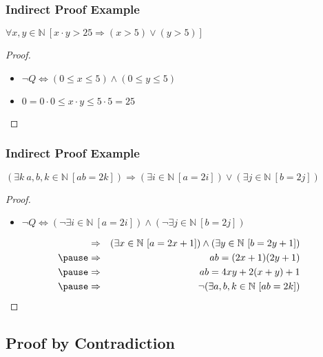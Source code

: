 \documentclass[dvipsnames]{beamer}
\begin{document}
\begin{frame}
  \frametitle{Indirect Proof Example}

  \begin{theorem}
    $\forall x,y \in \mathbb{N}~[x \cdot y > 25
      \Rightarrow (x > 5) \vee (y > 5)]$
  \end{theorem}

  \pause
  \begin{proof}
    \begin{itemize}
      \item $\neg Q \Leftrightarrow (0 \leq x \leq 5) \wedge (0 \leq y \leq 5)$

      \pause
      \item $0 = 0 \cdot 0 \leq x \cdot y \leq 5 \cdot 5 = 25$
    \end{itemize}
  \end{proof}
\end{frame}

\begin{frame}
  \frametitle{Indirect Proof Example}

  \begin{theorem}
    $(\exists k~a,b,k \in \mathbb{N}~[ab=2k]) \Rightarrow
      (\exists i \in \mathbb{N}~[a=2i]) \vee
      (\exists j \in \mathbb{N}~[b=2j])$
  \end{theorem}

  \pause
  \begin{proof}
    \begin{itemize}
      \item $\neg Q \Leftrightarrow (\neg \exists i \in \mathbb{N}~[a=2i])
                          \wedge (\neg \exists j \in \mathbb{N}~[b=2j])$
    \end{itemize}

    \pause
    \begin{eqnarray*}
      & \Rightarrow & (\exists x \in \mathbb{N}~[a=2x+1])
               \wedge (\exists y \in \mathbb{N}~[b=2y+1])\\\pause
      & \Rightarrow & ab=(2x+1)(2y+1)\\\pause
      & \Rightarrow & ab=4xy+2(x+y)+1\\\pause
      & \Rightarrow & \neg (\exists a,b,k \in \mathbb{N}~[ab=2k])
    \end{eqnarray*}
  \end{proof}
\end{frame}

\subsection{Proof by Contradiction}
\end{document}
